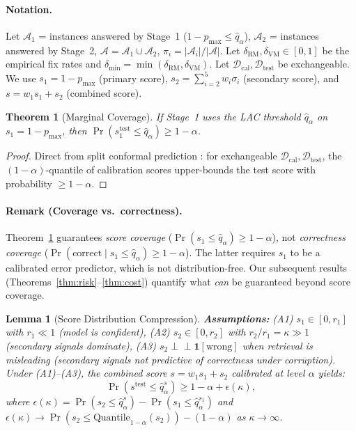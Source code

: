\documentclass[letterpaper]{article}
\newtheorem{theorem}{Theorem}
\newtheorem{lemma}{Lemma}
\begin{document}
\paragraph{Notation.}
Let $\mathcal{A}_1$ = instances answered by Stage~1 ($1{-}p_{\max} \leq \hat{q}_\alpha$), $\mathcal{A}_2$ = instances answered by Stage~2, $\mathcal{A} = \mathcal{A}_1 \cup \mathcal{A}_2$, $\pi_i = |\mathcal{A}_i|/|\mathcal{A}|$. Let $\delta_{\text{RM}}, \delta_{\text{VM}} \in [0,1]$ be the empirical fix rates and $\delta_{\min} = \min(\delta_{\text{RM}}, \delta_{\text{VM}})$. Let $\mathcal{D}_{\text{cal}}, \mathcal{D}_{\text{test}}$ be exchangeable. We use $s_1 = 1{-}p_{\max}$ (primary score), $s_2 = \sum_{i=2}^5 w_i \sigma_i$ (secondary score), and $s = w_1 s_1 + s_2$ (combined score).

\begin{theorem}[Marginal Coverage]
\label{thm:coverage}
If Stage~1 uses the LAC threshold $\hat{q}_\alpha$ on $s_1 = 1{-}p_{\max}$, then $\Pr(s_1^{\text{test}} \leq \hat{q}_\alpha) \geq 1 - \alpha$.
\end{theorem}

\begin{proof}
Direct from split conformal prediction \cite{vovk2005algorithmic}: for exchangeable $\mathcal{D}_{\text{cal}}, \mathcal{D}_{\text{test}}$, the $(1{-}\alpha)$-quantile of calibration scores upper-bounds the test score with probability $\geq 1{-}\alpha$.
\end{proof}

\paragraph{Remark (Coverage vs.\ correctness).}
Theorem~\ref{thm:coverage} guarantees \emph{score coverage} ($\Pr(s_1 \leq \hat{q}_\alpha) \geq 1{-}\alpha$), not \emph{correctness coverage} ($\Pr(\text{correct} \mid s_1 \leq \hat{q}_\alpha) \geq 1{-}\alpha$). The latter requires $s_1$ to be a calibrated error predictor, which is not distribution-free. Our subsequent results (Theorems~\ref{thm:risk}--\ref{thm:cost}) quantify what \emph{can} be guaranteed beyond score coverage.

\begin{lemma}[Score Distribution Compression]
\label{lem:compression}
\textbf{Assumptions:} (A1) $s_1 \in [0, r_1]$ with $r_1 \ll 1$ (model is confident), (A2) $s_2 \in [0, r_2]$ with $r_2/r_1 = \kappa \gg 1$ (secondary signals dominate), (A3) $s_2 \perp \!\!\! \perp \mathbf{1}[\text{wrong}]$ when retrieval is misleading (secondary signals not predictive of correctness under corruption). Under (A1)--(A3), the combined score $s = w_1 s_1 + s_2$ calibrated at level $\alpha$ yields:
\begin{equation}
\Pr(s^{\text{test}} \leq \hat{q}_\alpha^s) \geq 1 - \alpha + \epsilon(\kappa),
\label{eq:compression}
\end{equation}
where $\epsilon(\kappa) = \Pr(s_2 \leq \hat{q}_\alpha^s) - \Pr(s_1 \leq \hat{q}_\alpha^{s_1})$ and $\epsilon(\kappa) \to \Pr(s_2 \leq \text{Quantile}_{1-\alpha}(s_2)) - (1{-}\alpha)$ as $\kappa \to \infty$.
\end{lemma}
\end{document}
